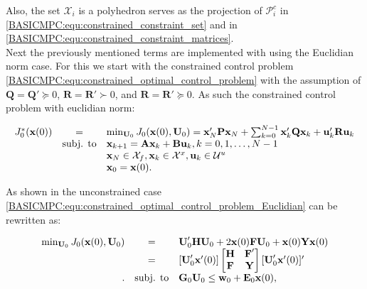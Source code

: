     Also, the set $\mathcal{X}_i$ is a polyhedron serves as the projection of $\mathcal{P}^c_i$ in \ref{BASICMPC:equ:constrained_constraint_set} and in \ref{BASICMPC:equ:constrained_constraint_matrices}.\\
    Next the previously mentioned terms are implemented with using the Euclidian norm case. For this we start with the constrained control problem \ref{BASICMPC:equ:constrained_optimal_control_problem} with the assumption of $\textbf{Q}=\textbf{Q}'\succeq0$, $\textbf{R}=\textbf{R}'\succ0$, and $\textbf{R}=\textbf{R}'\succeq0$. As such the constrained control problem with euclidian norm:

    \begin{equation}
        \begin{array}{rcl}
            J^*_0(\textbf{x}(0))&=&\min_{\textbf{U}_0}J_0(\textbf{x}(0),\textbf{U}_0)=
            \textbf{x}'_N\textbf{P}\textbf{x}_N+\sum^{N-1}_{k=0}\textbf{x}'_k\textbf{Q}\textbf{x}_k+\textbf{u}'_k\textbf{R}\textbf{u}_k\\
            &\textnormal{subj. to}&\textbf{x}_{k+1}=\textbf{Ax}_{k}+\textbf{Bu}_{k},k=0,1,\dots,N-1\\
            &&\textbf{x}_N\in\mathcal{X}_f,\textbf{x}_k\in\mathcal{X}^x,\textbf{u}_k\in\mathcal{U}^u\\
            &&\textbf{x}_0=\textbf{x}(0).
        \end{array}
        \label{BASICMPC:equ:constrained_optimal_control_problem_Euclidian}
    \end{equation}

    As shown in the unconstrained case \ref{BASICMPC:equ:constrained_optimal_control_problem_Euclidian} can be rewritten as:

\begin{equation}
    \begin{array}{rcl}
            \min_{\textbf{U}_0}J_0(\textbf{x}(0),\textbf{U}_0)&=& \textbf{U}'_0\textbf{H}\textbf{U}_0+2\textbf{x}(0)\textbf{F}\textbf{U}_0+\textbf{x}(0)\textbf{Y}\textbf{x}(0)\\
            &=&[\textbf{U}'_0\textbf{x}'(0)]
            \begin{bmatrix}
            \textbf{H}&\textbf{F}'\\
            \textbf{F}&\textbf{Y}\\
            \end{bmatrix}
            [\textbf{U}'_0\textbf{x}'(0)]'\\.
            &\textnormal{subj. to}&\textbf{G}_0\textbf{U}_0\leq\textbf{w}_0+\textbf{E}_0\textbf{x}(0),
        \end{array}
        \label{BASICMPC:equ:constrained_optimal_control_problem_Euclidian_second form}
    \end{equation}


